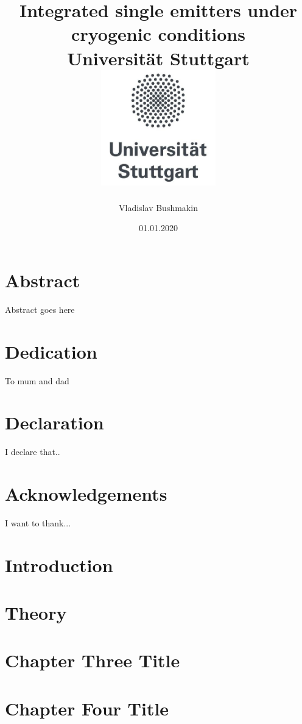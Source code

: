 \documentclass[14pt, twoside]{book}
\title{
{Integrated single emitters under cryogenic conditions}\\
{\large Universit\"at Stuttgart}\\
{\includegraphics[height=5cm]{images/logo1.jpg}}
}
\author{Vladislav Bushmakin}
\date{01.01.2020}
\begin{document}
\maketitle


\chapter*{Abstract}
Abstract goes here

\chapter*{Dedication}
To mum and dad

\chapter*{Declaration}
I declare that..

\chapter*{Acknowledgements}
I want to thank...

\tableofcontents

\chapter{Introduction}


\chapter{Theory}


\chapter{Chapter Three Title}


\chapter{Chapter Four Title}

\end{document}
